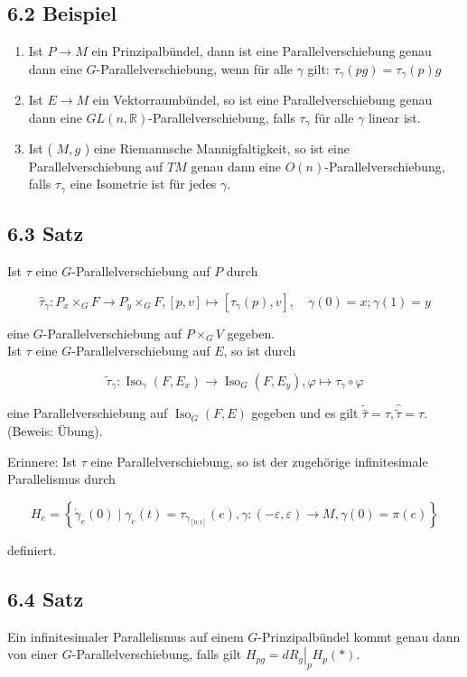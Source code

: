 \documentclass[10pt, letterpaper]{article}
\begin{document}
\subsection*{6.2 Beispiel}
\begin{enumerate}
  \item Ist $P \rightarrow M$ ein Prinzipalbündel, dann ist eine Parallelverschiebung genau dann eine $G$-Parallelverschiebung, wenn für alle $\gamma$ gilt: $\tau_{\gamma}(p g)=\tau_{\gamma}(p) g$
  \item Ist $E \rightarrow M$ ein Vektorraumbündel, so ist eine Parallelverschiebung genau dann eine $G L(n, \mathbb{R})$-Parallelverschiebung, falls $\tau_{\gamma}$ für alle $\gamma$ linear ist.
  \item Ist ( $M, g$ ) eine Riemannsche Mannigfaltigkeit, so ist eine Parallelverschiebung auf $T M$ genau dann eine $O(n)$-Parallelverschiebung, falls $\tau_{\gamma}$ eine Isometrie ist für jedes $\gamma$.
\end{enumerate}

\subsection*{6.3 Satz}
Ist $\tau$ eine $G$-Parallelverschiebung auf $P$ durch

$$
\hat{\tau}_{\gamma}: P_{x} \times_{G} F \rightarrow P_{y} \times_{G} F,[p, v] \mapsto\left[\tau_{\gamma}(p), v\right], \quad \gamma(0)=x ; \gamma(1)=y
$$

eine $G$-Parallelverschiebung auf $P \times_{G} V$ gegeben.\\
Ist $\tau$ eine $G$-Parallelverschiebung auf $E$, so ist durch

$$
\tilde{\tau}_{\gamma}: \operatorname{Iso}_{\gamma}\left(F, E_{x}\right) \rightarrow \operatorname{Iso}_{G}\left(F, E_{y}\right), \varphi \mapsto \tau_{\gamma} \circ \varphi
$$

eine Parallelverschiebung auf $\operatorname{Iso}_{G}(F, E)$ gegeben und es gilt $\tilde{\hat{\tau}}=\tau, \hat{\tilde{\tau}}=\tau$. (Beweis: Übung).

Erinnere: Ist $\tau$ eine Parallelverschiebung, so ist der zugehörige infinitesimale Parallelismus durch

$$
H_{e}=\left\{\dot{\gamma}_{e}(0) \mid \gamma_{e}(t)=\tau_{\gamma_{[0 ; t]}}(e), \gamma:(-\varepsilon, \varepsilon) \rightarrow M, \gamma(0)=\pi(e)\right\}
$$

definiert.

\subsection*{6.4 Satz}
Ein infinitesimaler Parallelismus auf einem $G$-Prinzipalbündel kommt genau dann von einer $G$-Parallelverschiebung, falls gilt $H_{p g}=\left.d R_{g}\right|_{p} H_{p}(*)$.
\end{document}
